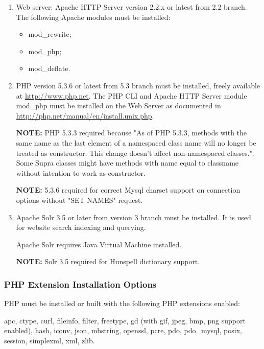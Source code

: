 \documentclass[12pt]{article}
\newcommand{\vigShowNotes}{1}
\newcommand{\note}[1]{
\textbf{NOTE:} 
#1
}
\begin{document}
\begin{enumerate}

\item 
Web server: Apache HTTP Server version 2.2.x or latest from 2.2 branch. The following Apache modules must be installed:
\begin{itemize}
	\item mod\_rewrite;
	\item mod\_php;
	\item mod\_deflate.
\end{itemize}

\item 
PHP version 5.3.6 or latest from 5.3 branch must be installed, freely available at \url{http://www.php.net}. The PHP CLI and Apache HTTP Server module \textsf{mod\_php} must be installed on the Web Server as documented in \url{http://php.net/manual/en/install.unix.php}.

\note{PHP 5.3.3 required because "As of PHP 5.3.3, methods with the same name as the last element of a namespaced class name will no longer be treated as constructor. This change doesn't affect non-namespaced classes.". Some Supra classes might have methods with name equal to classname without intention to work as constructor.}
	
\note{5.3.6 required for correct Mysql charset support on connection options without "SET NAMES" request.}

\item 	
Apache Solr 3.5 or later from version 3 branch must be installed. It is used for website search indexing and querying.

Apache Solr requires Java Virtual Machine installed.

\note{Solr 3.5 required for Hunspell dictionary support.}

\end{enumerate}

\subsubsection{PHP Extension Installation Options}

PHP must be installed or built with the following PHP extensions enabled:

\textsf{apc}, \textsf{ctype}, \textsf{curl}, \textsf{fileinfo}, \textsf{filter}, \textsf{freetype}, \textsf{gd} (with gif, jpeg, bmp, png support enabled), \textsf{hash}, \textsf{iconv}, \textsf{json}, \textsf{mbstring}, \textsf{openssl}, \textsf{pcre}, \textsf{pdo}, \textsf{pdo\_mysql}, \textsf{posix}, \textsf{session}, \textsf{simplexml}, \textsf{xml}, \textsf{zlib}.
\end{document}
